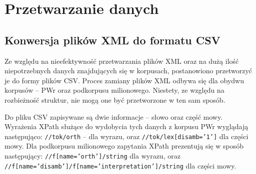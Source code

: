 \section{Przetwarzanie danych}
	\subsection{Konwersja plików XML do formatu CSV}
	Ze względu na nieefektywność przetwarzania plików XML oraz na dużą ilość niepotrzebnych danych znajdujących się w korpusach, postanowiono przetworzyć je do formy plików CSV.
Proces zamiany plików XML odbywa się dla obydwu korpusów -- PWr oraz podkorpusu milionowego.
	Niestety, ze względu na rozbieżność struktur, nie mogą one być przetworzone w ten sam sposób.
	
\begin{sloppypar}
Do pliku CSV zapisywane są dwie informacje -- słowo oraz część mowy.
Wyrażenia XPath służące do wydobycia tych danych z korpusu PWr wyglądają następująco:
\texttt{//tok/orth} -- dla wyrazu, oraz \texttt{//tok/lex[disamb='1']} dla części mowy. Dla podkorpusu milionowego zapytania XPath prezentują się w sposób następujący: \texttt{//f[name='orth']/string} dla wyrazu, oraz \texttt{//f[name='disamb']/f[name='interpretation']/string} dla części mowy.
\end{sloppypar}

